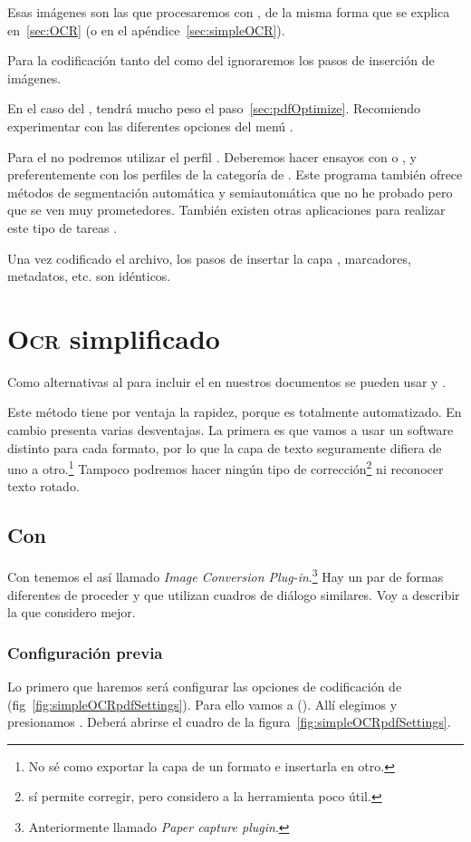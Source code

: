 \documentclass[%
	a5paper,
	10pt,
	twoside,
	openright,
	final,
]{memoir}
\begin{document}
	Esas imágenes son las que procesaremos con \abby, de la misma forma que se explica en~\ref{sec:OCR} (o en el apéndice~\ref{sec:simpleOCR}).

	Para la codificación tanto del \pdf como del \djvu ignoraremos los pasos de inserción de imágenes.

	En el caso del \pdf, tendrá mucho peso el paso~\ref{sec:pdfOptimize}. Recomiendo experimentar con las diferentes opciones del menú .

	Para el \djvu no podremos utilizar el perfil . Deberemos hacer ensayos con  o , y preferentemente con los perfiles de la categoría  de \djvusmallmod. Este programa también ofrece métodos de segmentación automática y semiautomática que no he probado pero que se ven muy prometedores. También existen otras aplicaciones para realizar este tipo de tareas \cite{didjvu}.

	Una vez codificado el archivo, los pasos de insertar la capa \ocr, marcadores, metadatos, etc. son idénticos.

	\chapter{\texorpdfstring{\textsc{Ocr}}{OCR} simplificado\label{sec:simpleOCR}} Como alternativas al \abby para incluir el \ocr en nuestros documentos se pueden usar \acrobat y \djvueditor.

	Este método tiene por ventaja la rapidez, porque es totalmente automatizado. En cambio presenta varias desventajas. La primera es que vamos a usar un software distinto para cada formato, por lo que la capa de texto seguramente difiera de uno a otro.\footnote{No sé como exportar la capa \ocr de un formato e insertarla en otro.} Tampoco podremos hacer ningún tipo de corrección\footnote{\acrobat sí permite corregir, pero considero a la herramienta poco útil.} ni reconocer texto rotado.

	\section{Con \acrobat} Con \acrobat tenemos el así llamado \emph{Image Conversion Plug-in}.\footnote{Anteriormente llamado \emph{Paper capture plugin}.} Hay un par de formas diferentes de proceder y que utilizan cuadros de diálogo similares. Voy a describir la que considero mejor.

	\subsection{Configuración previa} Lo primero que haremos será configurar las opciones de codificación de \acrobat (fig~\ref{fig:simpleOCRpdfSettings}). Para ello vamos a  (). Allí elegimos  y presionamos . Deberá abrirse el cuadro de la figura~\ref{fig:simpleOCRpdfSettings}.
\end{document}
